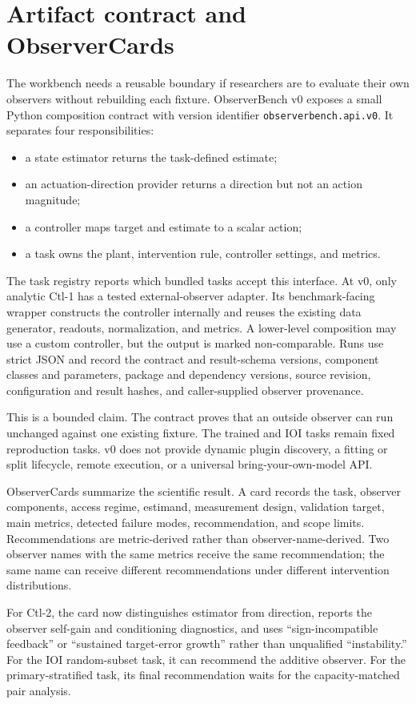 \section{Artifact contract and ObserverCards}

The workbench needs a reusable boundary if researchers are to evaluate their
own observers without rebuilding each fixture. ObserverBench v0 exposes a small
Python composition contract with version identifier
\texttt{observerbench.api.v0}. It separates four responsibilities:

\begin{itemize}
  \item a state estimator returns the task-defined estimate;
  \item an actuation-direction provider returns a direction but not an action
  magnitude;
  \item a controller maps target and estimate to a scalar action;
  \item a task owns the plant, intervention rule, controller settings, and
  metrics.
\end{itemize}

The task registry reports which bundled tasks accept this interface. At v0,
only analytic Ctl-1 has a tested external-observer adapter. Its benchmark-facing
wrapper constructs the controller internally and reuses the existing data
generator, readouts, normalization, and metrics. A lower-level composition may
use a custom controller, but the output is marked non-comparable. Runs use
strict JSON and record the contract and result-schema versions, component
classes and parameters, package and dependency versions, source revision,
configuration and result hashes, and caller-supplied observer provenance.

This is a bounded claim. The contract proves that an outside observer can run
unchanged against one existing fixture. The trained and IOI tasks remain fixed
reproduction tasks. v0 does not provide dynamic plugin discovery, a fitting or
split lifecycle, remote execution, or a universal bring-your-own-model API.

ObserverCards summarize the scientific result. A card records the task,
observer components, access regime, estimand, measurement design, validation
target, main metrics, detected failure modes, recommendation, and scope limits.
Recommendations are metric-derived rather than observer-name-derived. Two
observer names with the same metrics receive the same recommendation; the same
name can receive different recommendations under different intervention
distributions.

For Ctl-2, the card now distinguishes estimator from direction, reports the
observer self-gain and conditioning diagnostics, and uses ``sign-incompatible
feedback'' or ``sustained target-error growth'' rather than unqualified
``instability.'' For the IOI random-subset task, it can recommend the additive
observer. For the primary-stratified task, its final recommendation waits for
the capacity-matched pair analysis.
